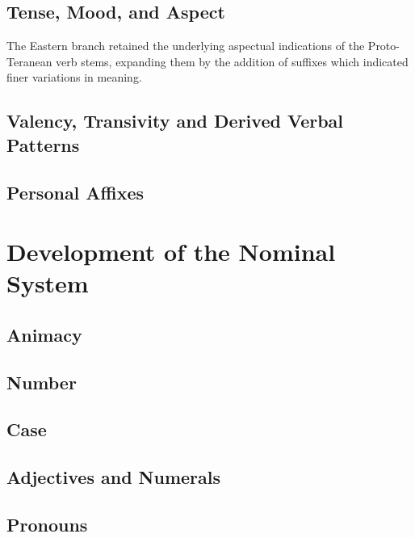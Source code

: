 \documentclass[grammar]{subfiles}
\begin{document}
\Tbw

\subsection{Tense, Mood, and Aspect}
\label{ssec:history:pt:vd:tense_mood_aspect}

The Eastern branch retained the underlying aspectual indications of the
Proto-Teranean verb stems, expanding them by the addition of suffixes which
indicated finer variations in meaning.

\Tbw

\subsection{Valency, Transivity and Derived Verbal Patterns}
\label{ssec:history:pt:vd:valency_verbal_patterns}

\Tbw

\subsection{Personal Affixes}
\label{ssec:history:pt:vd:personal_affixes}

\Tbw

\section{Development of the Nominal System}
\label{sec:history:pt:nominal_development}

\Tbw

\subsection{Animacy}
\label{ssec:history:pt:nd:animacy}

\Tbw

\subsection{Number}
\label{ssec:history:pt:nd:number}

\Tbw

\subsection{Case}
\label{ssec:history:pt:nd:case}

\Tbw

\subsection{Adjectives and Numerals}
\label{ssec:history:pt:nd:adjectives_numerals}

\Tbw

\subsection{Pronouns}
\label{ssec:history:pt:nd:pronouns}

\Tbw
\end{document}
